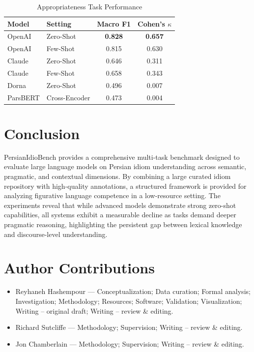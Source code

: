 \documentclass[11pt,a4paper]{article}
\begin{document}
\begin{table}[htbp]
\centering
\small
\caption{Appropriateness Task Performance}
\label{tab:appropriateness_results}
\begin{tabular}{llcc}
\toprule
\textbf{Model} & \textbf{Setting} & \textbf{Macro F1} & \textbf{Cohen's $\kappa$} \\
\midrule
OpenAI & Zero-Shot & \textbf{0.828} & \textbf{0.657}\\
OpenAI & Few-Shot & 0.815 & 0.630 \\
Claude & Zero-Shot & 0.646 & 0.311 \\
Claude & Few-Shot & 0.658 & 0.343 \\
Dorna & Zero-Shot & 0.496 & 0.007 \\
ParsBERT & Cross-Encoder & 0.473 & 0.004 \\
\bottomrule
\end{tabular}
\end{table}

\section{Conclusion}
PersianIdioBench provides a comprehensive multi-task benchmark designed to evaluate large language models on Persian idiom understanding across semantic, pragmatic, and contextual dimensions. By combining a large curated idiom repository with high-quality annotations, a structured framework is provided for analyzing figurative language competence in a low-resource setting. The experiments reveal that while advanced models demonstrate strong zero-shot capabilities, all systems exhibit a measurable decline as tasks demand deeper pragmatic reasoning, highlighting the persistent gap between lexical knowledge and discourse-level understanding.

\section*{Author Contributions}
\begin{itemize}
  \item Reyhaneh Hashempour --- Conceptualization; Data curation; Formal analysis; Investigation; Methodology; Resources; Software; Validation; Visualization; Writing -- original draft; Writing -- review \& editing.
  \item Richard Sutcliffe --- Methodology; Supervision; Writing -- review \& editing.
  \item Jon Chamberlain --- Methodology; Supervision; Writing -- review \& editing.
\end{itemize}



\end{document}
